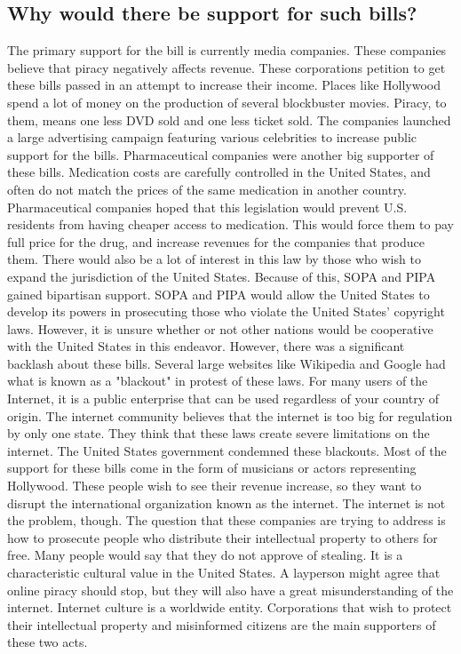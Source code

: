 \documentclass[11pt,journal,compsoc]{IEEEtran}
\begin{document}
\subsection{Why would there be support for such bills?}
The primary support for the bill is currently media companies. These companies believe that piracy negatively affects revenue. These corporations petition to get these bills passed in an attempt to increase their income. Places like Hollywood spend a lot of money on the production of several blockbuster movies. Piracy, to them, means one less DVD sold and one less ticket sold. The companies launched a large advertising campaign featuring various celebrities to increase public support for the bills. 
\indent Pharmaceutical companies were another big supporter of these bills. Medication costs are carefully controlled in the United States, and often do not match the prices of the same medication in another country. Pharmaceutical companies hoped that this legislation would prevent U.S. residents from having cheaper access to medication. This would force them to pay full price for the drug, and increase revenues for the companies that produce them. 
\indent There would also be a lot of interest in this law by those who wish to expand the jurisdiction of the United States. Because of this, SOPA and PIPA gained bipartisan support.  SOPA and PIPA would allow the United States to develop its powers in prosecuting those who violate the United States' copyright laws. However, it is unsure whether or not other nations would be cooperative with the United States in this endeavor. 
\indent However, there was a significant backlash about these bills. Several large websites like Wikipedia and Google had what is known as a "blackout" in protest of these laws. For many users of the Internet, it is a public enterprise that can be used regardless of your country of origin. The internet community believes that the internet is too big for regulation by only one state. They think that these laws create severe limitations on the internet. The United States government condemned these blackouts. 
\indent Most of the support for these bills come in the form of musicians or actors representing Hollywood. These people wish to see their revenue increase, so they want to disrupt the international organization known as the internet. The internet is not the problem, though. The question that these companies are trying to address is how to prosecute people who distribute their intellectual property to others for free. Many people would say that they do not approve of stealing. It is a characteristic cultural value in the United States. A layperson might agree that online piracy should stop, but they will also have a great misunderstanding of the internet. Internet culture is a worldwide entity. Corporations that wish to protect their intellectual property and misinformed citizens are the main supporters of these two acts.
\end{document}
